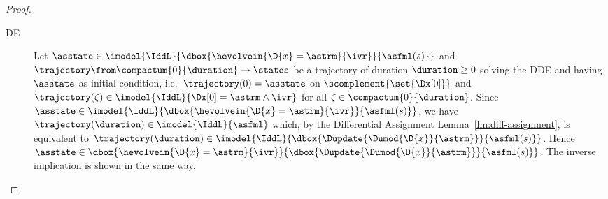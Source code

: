 \begin{proof}
\begin{description}
        \item[DE] Let $\asstate\in\imodel{\IddL}{\dbox{\hevolvein{\D{x}=\astrm}{\ivr}}{\asfml(s)}}$ and $\trajectory\from\compactum{0}{\duration}\to\states$ be a trajectory of duration $\duration\geq 0$ solving the DDE and having $\asstate$ as initial condition, i.e.\ $\trajectory(0)=\asstate$ on $\scomplement{\set{\Dx[0]}}$ and $\trajectory(\zeta)\in\imodel{\IddL}{\Dx[0]=\astrm\land\ivr}$ for all $\zeta\in\compactum{0}{\duration}$.
        Since $\asstate\in\imodel{\IddL}{\dbox{\hevolvein{\D{x}=\astrm}{\ivr}}{\asfml(s)}}$, we have $\trajectory(\duration)\in\imodel{\IddL}{\asfml}$ which, by the Differential Assignment Lemma~\ref{lm:diff-assignment}, is equivalent to $\trajectory(\duration)\in\imodel{\IddL}{\dbox{\Dupdate{\Dumod{\D{x}}{\astrm}}}{\asfml(s)}}$. Hence $\asstate\in\dbox{\hevolvein{\D{x}=\astrm}{\ivr}}{\dbox{\Dupdate{\Dumod{\D{x}}{\astrm}}}{\asfml(s)}}$.
        The inverse implication is shown in the same way.
    \end{description}
    \end{proof}




    



